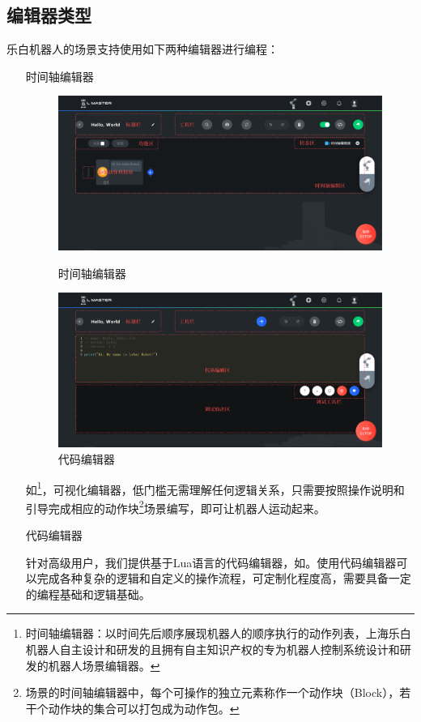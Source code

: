 \subsection{编辑器类型}
乐白机器人的场景支持使用如下两种编辑器进行编程：
\begin{itemize}[leftmargin=6.5em]
	\item [时间轴编辑器]

	\begin{figure}[htb]
		\centering
		\includegraphics[width=\textwidth]{shots/timeline_editor.pdf}
		\caption{时间轴编辑器}
		\label{fig:时间轴编辑器}

		\includegraphics[width=\textwidth]{shots/code_editor.pdf}
		\caption{代码编辑器}
		\label{fig:代码编辑器}
	\end{figure}

	如\footnote{时间轴编辑器：以时间先后顺序展现机器人的顺序执行的动作列表，上海乐白机器人自主设计和研发的且拥有自主知识产权的专为机器人控制系统设计和研发的机器人场景编辑器。}，可视化编辑器，低门槛无需理解任何逻辑关系，只需要按照操作说明和引导完成相应的动作块\footnote{场景的时间轴编辑器中，每个可操作的独立元素称作一个动作块（Block），若干个动作块的集合可以打包成为动作包。}场景编写，即可让机器人运动起来。

	\item [代码编辑器]

	针对高级用户，我们提供基于Lua语言的代码编辑器，如。使用代码编辑器可以完成各种复杂的逻辑和自定义的操作流程，可定制化程度高，需要具备一定的编程基础和逻辑基础。

\end{itemize}

